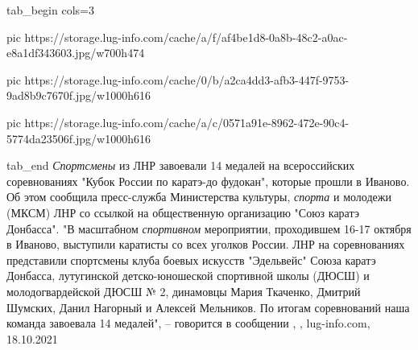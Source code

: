 \ifcmt
  tab_begin cols=3

     pic https://storage.lug-info.com/cache/a/f/af4be1d8-0a8b-48c2-a0ac-e8a1df343603.jpg/w700h474

     pic https://storage.lug-info.com/cache/0/b/a2ca4dd3-afb3-447f-9753-9ad8b9c7670f.jpg/w1000h616

     pic https://storage.lug-info.com/cache/a/c/0571a91e-8962-472e-90c4-5774da23506f.jpg/w1000h616

  tab_end
\fi
\emph{Спортсмены} из ЛНР завоевали 14 медалей на всероссийских соревнованиях
"Кубок России по каратэ-до фудокан", которые прошли в Иваново. Об этом сообщила
пресс-служба Министерства культуры, \emph{спорта} и молодежи (МКСМ) ЛНР со
ссылкой на общественную организацию "Союз каратэ Донбасса".  "В масштабном
\emph{спортивном} мероприятии, проходившем 16-17 октября в Иваново, выступили
каратисты со всех уголков России. ЛНР на соревнованиях представили спортсмены
клуба боевых искусств "Эдельвейс" Союза каратэ Донбасса, лутугинской
детско-юношеской спортивной школы (ДЮСШ) и молодогвардейской ДЮСШ № 2,
динамовцы Мария Ткаченко, Дмитрий Шумских, Данил Нагорный и Алексей Мельников.
По итогам соревнований наша команда завоевала 14 медалей", – говорится в
сообщении
, 
, lug-info.com, 18.10.2021
